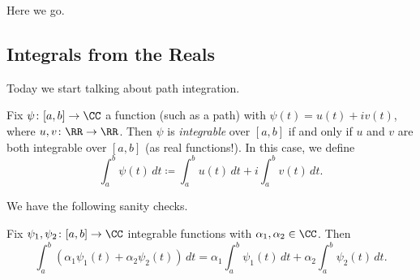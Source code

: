 
Here we go.

\subsection{Integrals from the Reals}
Today we start talking about path integration.
\begin{definition}[Integrable]
	Fix $\psi\colon [a,b]\to\CC$ a function (such as a path) with $\psi(t)=u(t)+iv(t)$, where $u,v\colon \RR\to\RR$. Then $\psi$ is \textit{integrable} over $[a,b]$ if and only if $u$ and $v$ are both integrable over $[a,b]$ (as real functions!). In this case, we define
	\[\int_a^b\psi(t)\,dt\coloneqq \int_a^bu(t)\,dt+i\int_a^bv(t)\,dt.\]
\end{definition}
We have the following sanity checks.
\begin{lemma} \label{lem:integraldistribute}
	Fix $\psi_1,\psi_2\colon [a,b]\to\CC$ integrable functions with $\alpha_1,\alpha_2\in\CC$. Then
	\[\int_a^b(\alpha_1\psi_1(t)+\alpha_2\psi_2(t))\,dt=\alpha_1\int_a^b\psi_1(t)\,dt+\alpha_2\int_a^b\psi_2(t)\,dt.\]
\end{lemma}
